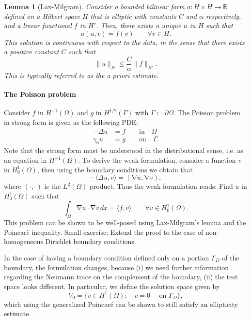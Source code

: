 \documentclass{article}
\DeclareMathOperator{\grad}{\nabla}
\newcommand{\R}{\mathbb{R}}
\newcommand{\tin}{\text{in}}
\newcommand{\ton}{\text{on}}
\newtheorem{lemma}{Lemma}
\begin{document}
\begin{lemma}[Lax-Milgram] Consider a bounded bilinear form $a: H\times H\to \R$ defined on a Hilbert space $H$ that is elliptic with constants $C$ and $\alpha$ respectively, and a linear functional $f$ in $H'$. Then, there exists a unique $u$ in $H$ such that 
    $$ a(u, v) = f(v) \qquad \forall v \in H. $$
This solution is continuous with respect to the data, in the sense that there exists a positive constant $C$ such that 
    $$ \| u\|_H \leq \frac C \alpha \| f \|_{H'} .$$
This is typically referred to as the \emph{a priori} estimate. 
\end{lemma}



\paragraph{The Poisson problem} Consider $f$ in $H^{-1}(\Omega)$ and $g$ in $H^{1/2}(\Gamma)$ with $\Gamma\coloneqq \partial\Omega$. The Poisson problem in strong form is given as the following PDE: 
    \begin{align*}
        -\Delta u  &= f \qquad \tin\quad\Omega\\
        \gamma_0 u &= g \qquad \ton\quad \Gamma.
    \end{align*}
Note that the strong form must be understood in the distributional sense, i.e. as an equation in $H^{-1}(\Omega)$. To derive the weak formulation, consider a function $v$ in $H_0^1(\Omega)$, then using the boundary conditions we obtain that 
    $$ -\langle \Delta u,v\rangle = (\grad u, \grad v),$$
where $(\cdot, \cdot)$ is the $L^2(\Omega)$ product. Thus the weak formulation reads: Find $u$ in $H_0^1(\Omega)$ such that 
    $$ \int_\Omega \grad u\cdot \grad v\,dx = \langle f, v\rangle \qquad \forall v\in H_0^1(\Omega).$$
This problem can be shown to be well-posed using Lax-Milgram's lemma and the Poincarè inequality. Small exercise: Extend the proof to the case of non-homogeneous Dirichlet boundary conditions.

In the case of having a boundary condition defined only on a portion $\Gamma_D$ of the boundary, the formulation changes, because (i) we need further information regarding the Neumann trace on the complement of the boundary, (ii) the test space looks different. In particular, we define the solution space given by 
    $$ V_0 = \{v\in H^1(\Omega): \quad v = 0 \quad\text{ on $\Gamma_D$}\}, $$
which using the generalized Poincaré can be shown to still satisfy an ellipticity estimate. 
\end{document}
